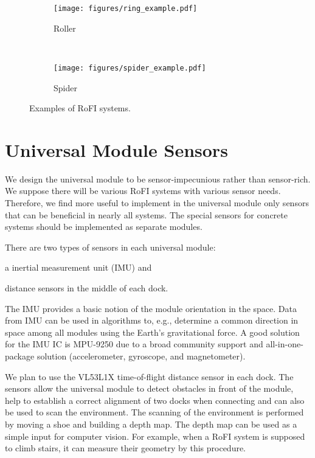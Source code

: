 \begin{figure}[!t]
    \centering
    \begin{subfigure}[b]{0.45\textwidth}
        \texttt{[image: figures/ring\_example.pdf]}
        \caption{Roller}
        \label{fig:example_roller}
    \end{subfigure}
    ~
    \begin{subfigure}[b]{0.45\textwidth}
        \texttt{[image: figures/spider\_example.pdf]}
        \caption{Spider}
        \label{fig:example_spider}
    \end{subfigure}

    \caption{Examples of RoFI systems.}
    \label{fig:examples}
\end{figure}

\section{Universal Module Sensors}

We design the universal module to be sensor-impecunious rather than sensor-rich.
We suppose there will be various RoFI systems with various sensor needs.
Therefore, we find more useful to implement in the universal module only sensors
that can be beneficial in nearly all systems. The special sensors for concrete
systems should be implemented as separate modules.

There are two types of sensors in each universal module:
\begin{enumerate*}
    \item a inertial measurement unit (IMU) and
    \item distance sensors in the middle of each dock.
\end{enumerate*}
The IMU provides a basic notion of the module orientation in the space. Data
from IMU can be used in algorithms to, e.g., determine a common direction in
space among all modules using the Earth's gravitational force. A good solution
for the IMU IC is MPU-9250 \cite{noauthor_mpu-9250_2016} due to a broad
community support and all-in-one-package solution (accelerometer, gyroscope, and
magnetometer).

We plan to use the VL53L1X \cite{noauthor_new_2018} time-of-flight distance
sensor in each dock. The sensors allow the universal module to detect obstacles
in front of the module, help to establish a correct alignment of two docks when
connecting and can also be used to scan the environment. The scanning of the
environment is performed by moving a shoe and building a depth map. The depth
map can be used as a simple input for computer vision. For example, when a RoFI
system is supposed to climb stairs, it can measure their geometry by this
procedure.

